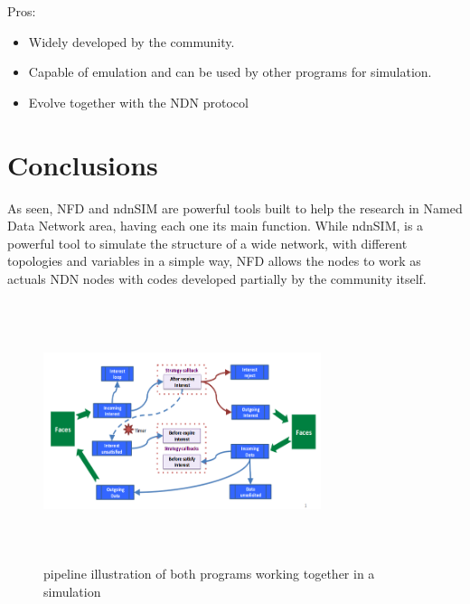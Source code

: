 \documentclass[preprint,12pt]{elsarticle}
\begin{document}
Pros:
\begin{itemize}
		\item Widely developed by the community.
		
		\item Capable of emulation and can be used by other programs for simulation.
		
		\item Evolve together with the NDN protocol
		
	\end{itemize}
\section{Conclusions}
\label{S:3}
As seen, NFD and ndnSIM are powerful tools built to help the research in Named Data Network area, having each one its main function. While ndnSIM, is a powerful tool to simulate the structure of a wide network, with different topologies and variables in a simple way, NFD allows the nodes to work as actuals NDN nodes with codes developed partially by the community itself.\par
\begin{figure}[ht]
			\centering
			\includegraphics[height=3in, width=3.2in]{./Figures/Pipeline}
			\caption{pipeline illustration of both programs working together in a simulation}
			\label{fig:not_congested_results1}
		\end{figure} 
\end{document}
